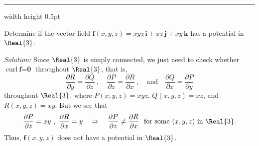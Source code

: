 \vspace{3mm}
\hrule width \textwidth height 0.5pt
\begin{exa}
 Determine if the vector field $\textbf{f}(x,y,z) = xyz\,\textbf{i} + xz\,\textbf{j} + xy\,\textbf{k}$ has a
 potential in $\Real{3}$.\vspace{1mm}
 \par\noindent\emph{Solution:} Since $\Real{3}$ is simply connected, we just need to check whether $\text{curl}~
 \textbf{f} = \textbf{0}$ throughout $\Real{3}$, that is,
 \begin{displaymath}
  \frac{\partial R}{\partial y} = \frac{\partial Q}{\partial z}~,\quad
  \frac{\partial P}{\partial z} = \frac{\partial R}{\partial x}~,\quad\text{and}\quad
  \frac{\partial Q}{\partial x} = \frac{\partial P}{\partial y}
 \end{displaymath}
 throughout $\Real{3}$, where $P(x,y,z)=xyz$, $Q(x,y,z)=xz$, and $R(x,y,z)=xy$. But we see that
 \begin{displaymath}
  \frac{\partial P}{\partial z} = xy ~,~ \frac{\partial R}{\partial x} = y \quad\Rightarrow\quad
  \frac{\partial P}{\partial z} \ne \frac{\partial R}{\partial x} ~~\text{for some $(x,y,z)$ in $\Real{3}$.}
 \end{displaymath}
 Thus, $\textbf{f}(x,y,z)$ does not have a potential in $\Real{3}$.
\end{exa}
